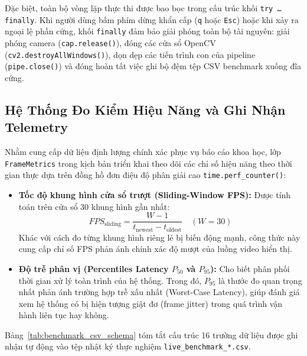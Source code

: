 Đặc biệt, toàn bộ vòng lặp thực thi được bao bọc trong cấu trúc khối \texttt{try \dots finally}. Khi người dùng bấm phím dừng khẩn cấp (\texttt{q} hoặc \texttt{Esc}) hoặc khi xảy ra ngoại lệ phần cứng, khối \texttt{finally} đảm bảo giải phóng toàn bộ tài nguyên: giải phóng camera (\texttt{cap.release()}), đóng các cửa sổ OpenCV (\texttt{cv2.destroyAllWindows()}), dọn dẹp các tiến trình con của pipeline (\texttt{pipe.close()}) và đóng hoàn tất việc ghi bộ đệm tệp CSV benchmark xuống đĩa cứng.

\subsection{Hệ Thống Đo Kiểm Hiệu Năng và Ghi Nhận Telemetry}
\label{subsec:do_kiem_telemetry}

Nhằm cung cấp dữ liệu định lượng chính xác phục vụ báo cáo khoa học, lớp \texttt{FrameMetrics} trong kịch bản triển khai theo dõi các chỉ số hiệu năng theo thời gian thực dựa trên đồng hồ đơn điệu độ phân giải cao \texttt{time.perf_counter()}:

\begin{itemize}
    \item \textbf{Tốc độ khung hình cửa sổ trượt (Sliding-Window FPS):} Được tính toán trên cửa sổ 30 khung hình gần nhất:
    \begin{equation}
    \label{eq:sliding_fps}
    FPS_{\text{sliding}} = \frac{W - 1}{t_{\text{newest}} - t_{\text{oldest}}} \quad (W = 30)
    \end{equation}
    Khác với cách đo từng khung hình riêng lẻ bị biến động mạnh, công thức này cung cấp chỉ số FPS phản ánh chính xác độ mượt của luồng video hiển thị.
    \item \textbf{Độ trễ phân vị (Percentiles Latency $P_{50}$ và $P_{95}$):} Cho biết phân phối thời gian xử lý toàn trình của hệ thống. Trong đó, $P_{95}$ là thước đo quan trọng nhất phản ánh trường hợp trễ xấu nhất (Worst-Case Latency), giúp đánh giá xem hệ thống có bị hiện tượng giật đơ (frame jitter) trong quá trình vận hành liên tục hay không.
\end{itemize}

Bảng~\ref{tab:benchmark_csv_schema} tóm tắt cấu trúc 16 trường dữ liệu được ghi nhận tự động vào tệp nhật ký thực nghiệm \texttt{live\_benchmark\_*.csv}.

